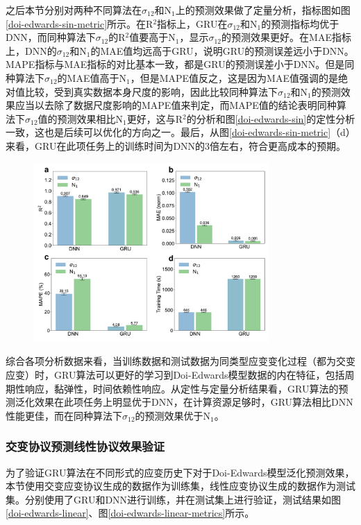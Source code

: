 之后本节分别对两种不同算法在$\sigma_{12}$和N$_1$上的预测效果做了定量分析，指标图如图\ref{doi-edwards-sin-metric}所示。在R$^2$指标上，GRU在$\sigma_{12}$和N$_1$的预测指标均优于DNN，而同种算法下$\sigma_{12}$的R$^2$值要高于N$_1$，显示$\sigma_{12}$的预测效果更好。在MAE指标上，DNN的$\sigma_{12}$和N$_1$的MAE值均远高于GRU，说明GRU的预测误差远小于DNN。MAPE指标与MAE指标的对比基本一致，都是GRU的预测误差小于DNN。但是同种算法下$\sigma_{12}$的MAE值高于N$_1$，但是MAPE值反之，这是因为MAE值强调的是绝对值比较，受到真实数据本身尺度的影响，因此比较同种算法下$\sigma_{12}$和N$_1$的预测效果应当以去除了数据尺度影响的MAPE值来判定，而MAPE值的结论表明同种算法下$\sigma_{12}$值的预测效果相比N$_1$更好，这与R$^2$的分析和图\ref{doi-edwards-sin}的定性分析一致，这也是后续可以优化的方向之一。最后，从图\ref{doi-edwards-sin-metric}（d）来看，GRU在此项任务上的训练时间为DNN的3倍左右，符合更高成本的预期。
\begin{figure}[htbp]
  \centering
  \includegraphics[width=0.8\textwidth]{Fig/doi-edwards-sin-metrics.pdf}
  \FigureBicaption{\label{doi-edwards-sin-metric}}{}
\end{figure}
综合各项分析数据来看，当训练数据和测试数据为同类型应变变化过程（都为交变应变）时，GRU算法可以更好的学习到Doi-Edwards模型数据的内在特征，包括周期性响应，黏弹性，时间依赖性响应。从定性与定量分析结果看，GRU算法的预测泛化效果在此项任务上明显优于DNN，在计算资源足够时，GRU算法相比DNN性能更佳，而在同种算法下$\sigma_{12}$的预测效果优于N$_1$。
\subsubsection{交变协议预测线性协议效果验证}
为了验证GRU算法在不同形式的应变历史下对于Doi-Edwards模型泛化预测效果，本节使用交变应变协议生成的数据作为训练集，线性应变协议生成的数据作为测试集。分别使用了GRU和DNN进行训练，并在测试集上进行验证，测试结果如图\ref{doi-edwards-linear}、图\ref{doi-edwards-linear-metrics}所示。

